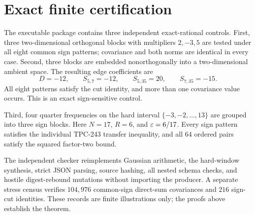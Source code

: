 \section{Exact finite certification}

The executable package contains three independent exact-rational controls.
First, three two-dimensional orthogonal blocks with multipliers $2,-3,5$ are
tested under all eight common sign patterns; covariance and both norms are
identical in every case.  Second, three blocks are embedded nonorthogonally
into a two-dimensional ambient space.  The resulting edge coefficients are
\[
D=-12,\qquad S_{5,7}=-12,\qquad S_{5,35}=20,\qquad S_{7,35}=-15.
\]
All eight patterns satisfy the cut identity, and more than one covariance value
occurs.  This is an exact sign-sensitive control.

Third, four quarter frequencies on the hard interval
$\{-3,-2,\ldots,13\}$ are grouped into three sign blocks.  Here $N=17$,
$R=6$, and $\varepsilon=6/17$.  Every sign pattern satisfies the individual
TPC-243 transfer inequality, and all $64$ ordered pairs satisfy the squared
factor-two bound.

The independent checker reimplements Gaussian arithmetic, the hard-window
synthesis, strict JSON parsing, source hashing, all nested schema checks, and
hostile digest-rebound mutations without importing the producer.  A separate
stress census verifies $104{,}976$ common-sign direct-sum covariances and $216$
sign-cut identities.  These records are finite illustrations only; the proofs
above establish the theorem.
